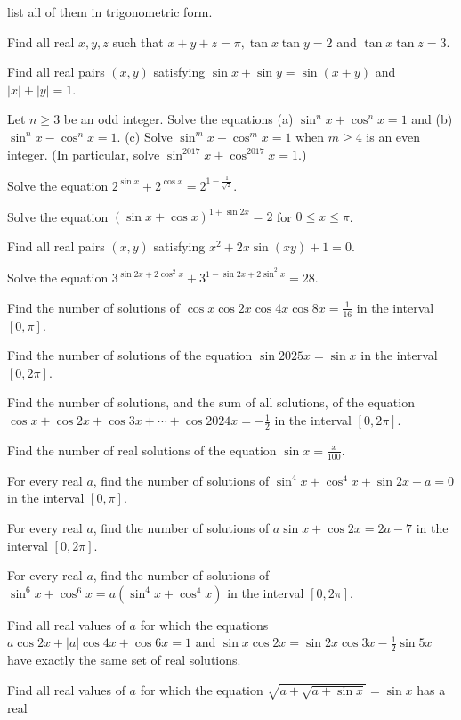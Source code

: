   list all of them in trigonometric form.
\item Find all real $x, y, z$ such that $x + y + z = \pi, \tan x\tan y = 2$ and $\tan x\tan z = 3$.
\item Find all real pairs $(x, y)$ satisfying $\sin x + \sin y = \sin(x + y)$ and $|x| + |y| = 1$.
\item Let $n\ge 3$ be an odd integer. Solve the equations (a) $\sin^nx + \cos^nx = 1$ and (b) $\sin^nx -
  \cos^nx = 1$. (c) Solve $\sin^mx + \cos^mx = 1$ when $m\ge 4$ is an even integer. (In particular, solve
  $\sin^{2017}x + \cos^{2017}x = 1$.)
\item Solve the equation $2^{\sin x} + 2^{\cos x} = 2^{1 - \frac{1}{\sqrt{2}}}$.
\item Solve the equation $(\sin x + \cos x)^{1 + \sin2x} = 2$ for $0\le x\le\pi$.
\item Find all real pairs $(x, y)$ satisfying $x^2 + 2x\sin(xy) + 1 = 0$.
\item Solve the equation $3^{\sin2x + 2\cos^2x} + 3^{1 - \sin2x + 2\sin^2x} = 28$.
\item Find the number of solutions of $\cos x\cos2x\cos4x\cos8x = \frac{1}{16}$ in the interval $[0, \pi]$.
\item Find the number of solutions of the equation $\sin2025x = \sin x$ in the interval $[0, 2\pi]$.
\item Find the number of solutions, and the sum of all solutions, of the equation $\cos x + \cos2x + \cos3x
  + \cdots + \cos2024x = -\frac{1}{2}$ in the interval $[0, 2\pi]$.
\item Find the number of real solutions of the equation $\sin x = \frac{x}{100}$.
\item For every real $a$, find the number of solutions of $\sin^4x + \cos^4x + \sin2x + a = 0$ in the
  interval $[0, \pi]$.
\item For every real $a$, find the number of solutions of $a\sin x + \cos2x = 2a - 7$ in the interval $[0,
  2\pi]$.
\item For every real $a$, find the number of solutions of $\sin^6x + \cos^6x = a\left(\sin^4x +
  \cos^4x\right)$ in the interval $[0, 2\pi]$.
\item Find all real values of $a$ for which the equations $a\cos2x + |a|\cos4x + \cos6x = 1$ and $\sin x\cos2x
  = \sin2x\cos3x - \frac{1}{2}\sin5x$ have exactly the same set of real solutions.
\item Find all real values of $a$ for which the equation $\sqrt{a + \sqrt{a + \sin x}} = \sin x$ has a real
